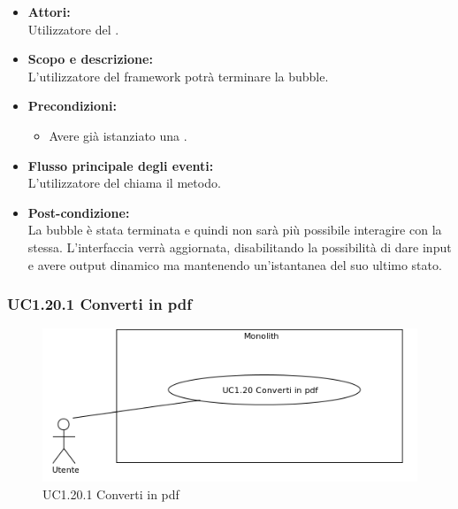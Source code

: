 \begin{itemize}
	\item \textbf{Attori:}
	\\Utilizzatore del .
	\item \textbf{Scopo e descrizione:} 
	\\L’utilizzatore del framework potrà terminare la bubble.
	\item \textbf{Precondizioni:}
	\begin{itemize}
		\item Avere già istanziato una .
	\end{itemize}
	\item \textbf{Flusso principale degli eventi:}
	\\L’utilizzatore del  chiama il metodo.
	\item \textbf{Post-condizione:}
	\\La bubble è stata terminata e quindi non sarà più possibile interagire con la stessa. L’interfaccia verrà aggiornata, disabilitando la possibilità di dare input e avere output dinamico ma mantenendo un’istantanea del suo ultimo stato.
\end{itemize}

\subsubsection{UC1.20.1 Converti in pdf} \label{UC1.20.1}

\begin{figure}[H]
	\centering
	\includegraphics[width=15cm]{../../documenti/AnalisiDeiRequisiti/Diagrammi_img/uc1_20.png}
	\caption{UC1.20.1 Converti in pdf}
\end{figure}

